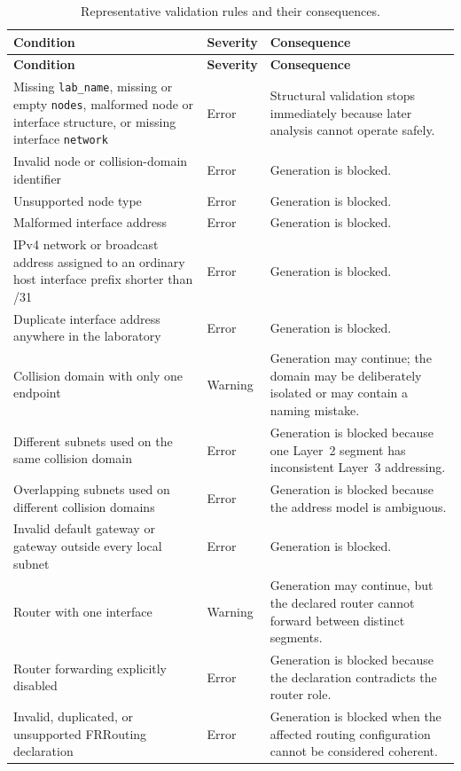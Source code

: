 {\small
\begin{longtable}{>{\raggedright\arraybackslash}p{}>{\raggedright\arraybackslash}p{}>{\raggedright\arraybackslash}p{}}
\caption{Representative validation rules and their consequences.}
\label{tab:error-warning-policy}\\
\toprule
\textbf{Condition} & \textbf{Severity} & \textbf{Consequence} \\
\midrule
\endfirsthead
\toprule
\textbf{Condition} & \textbf{Severity} & \textbf{Consequence} \\
\midrule
\endhead
Missing \texttt{lab\_name}, missing or empty \texttt{nodes}, malformed node or interface structure, or missing interface \texttt{network} & Error & Structural validation stops immediately because later analysis cannot operate safely. \\
Invalid node or collision-domain identifier & Error & Generation is blocked. \\
Unsupported node type & Error & Generation is blocked. \\
Malformed interface address & Error & Generation is blocked. \\
IPv4 network or broadcast address assigned to an ordinary host interface prefix shorter than /31 & Error & Generation is blocked. \\
Duplicate interface address anywhere in the laboratory & Error & Generation is blocked. \\
Collision domain with only one endpoint & Warning & Generation may continue; the domain may be deliberately isolated or may contain a naming mistake. \\
Different subnets used on the same collision domain & Error & Generation is blocked because one Layer~2 segment has inconsistent Layer~3 addressing. \\
Overlapping subnets used on different collision domains & Error & Generation is blocked because the address model is ambiguous. \\
Invalid default gateway or gateway outside every local subnet & Error & Generation is blocked. \\
Router with one interface & Warning & Generation may continue, but the declared router cannot forward between distinct segments. \\
Router forwarding explicitly disabled & Error & Generation is blocked because the declaration contradicts the router role. \\
Invalid, duplicated, or unsupported FRRouting declaration & Error & Generation is blocked when the affected routing configuration cannot be considered coherent. \\

\end{longtable}}
